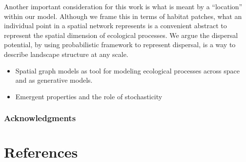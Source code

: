 \documentclass[10pt,oneside]{article}
\begin{document}
Another important consideration for this work is what is meant by a
``location'' within our model. Although we frame this in terms of
habitat patches, what an individual point in a spatial network
represents is a convenient abstract to represent the spatial dimension
of ecological processes. We argue the dispersal potential, by using
probabilistic framework to represent dispersal, is a way to describe
landscape structure at any scale.

\begin{itemize}
\tightlist
\item
  Spatial graph models as tool for modeling ecological processes across
  space and as generative models.
\item
  Emergent properties and the role of stochasticity
\end{itemize}

\hypertarget{acknowledgments}{%
\subsubsection{Acknowledgments}\label{acknowledgments}}

\hypertarget{references}{%
\section*{References}\label{references}}
\end{document}
